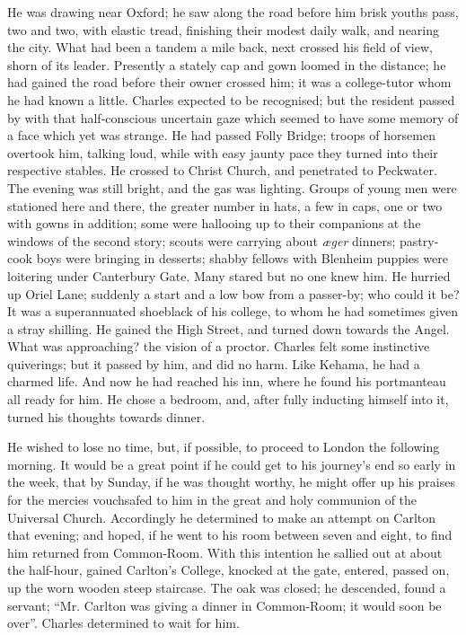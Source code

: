 He was drawing near Oxford; he saw along the road before him brisk
youths pass, two and two, with elastic tread, finishing their modest
daily walk, and nearing the city. What had been a tandem a mile back,
next crossed his field of view, shorn of its leader. Presently a
stately cap and gown loomed in the distance; he had gained the road
before their owner crossed him; it was a college-tutor whom he had
known a little. Charles expected to be recognised; but the resident
passed by with that half-conscious uncertain gaze which seemed to have
some memory of a face which yet was strange. He had passed Folly
Bridge; troops of horsemen overtook him, talking loud, while with easy
jaunty pace they turned into their respective stables. He crossed to
Christ Church, and penetrated to Peckwater. The evening was still
bright, and the gas was lighting. Groups of young men were stationed
here and there, the greater number in hats, a few in caps, one or two
with gowns in addition; some were hallooing up to their companions at
the windows of the second story; scouts were carrying about \emph{æger}
dinners; pastry-cook boys were bringing in desserts; shabby fellows
with Blenheim puppies were loitering under Canterbury Gate. Many
stared but no one knew him. He hurried up Oriel Lane; suddenly a
start and a low bow from a passer-by; who could it be? It was a
superannuated shoeblack of his college, to whom he had sometimes given
a stray shilling. He gained the High Street, and turned down towards
the Angel. What was approaching? the vision of a proctor. Charles felt
some instinctive quiverings; but it passed by him, and did no harm.
Like Kehama, he had a charmed life. And now he had reached his inn,
where he found his portmanteau all ready for him. He chose a bedroom,
and, after fully inducting himself into it, turned his thoughts
towards dinner.

He wished to lose no time, but, if possible, to proceed to London
the following morning. It would be a great point if he could get to
his journey's end so early in the week, that by Sunday, if he was
thought worthy, he might offer up his praises for the mercies
vouchsafed to him in the great and holy communion of the Universal
Church. Accordingly he determined to make an attempt on Carlton that
evening; and hoped, if he went to his room between seven and eight, to
find him returned from Common-Room. With this intention he sallied out
at about the half-hour, gained Carlton's College, knocked at the
gate, entered, passed on, up the worn wooden steep staircase. The oak
was closed; he descended, found a servant; ``Mr. Carlton was
giving a dinner in Common-Room; it would soon be over''. Charles
determined to wait for him.

